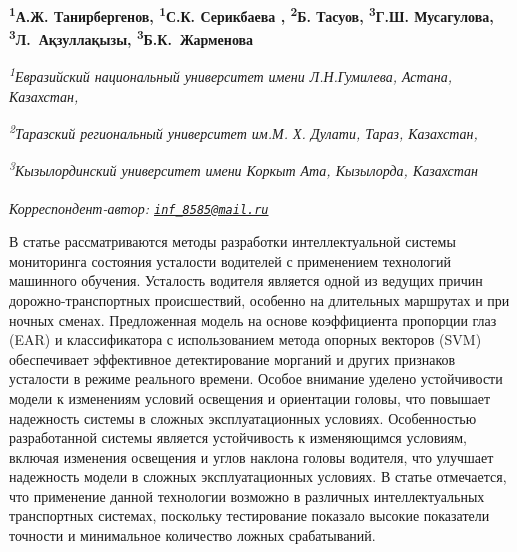 
\begin{articleheader}

{\bfseries \textsuperscript{1}А.Ж. Танирбергенов,
\textsuperscript{1}С.К. Серикбаева\textsuperscript{\envelope } ,
\textsuperscript{2}Б. Тасуов,
\textsuperscript{3}Г.Ш. Мусагулова,
\textsuperscript{3}Л.~Ақзуллақызы,
\textsuperscript{3}Б.К.~Жарменова}
\end{articleheader}

\begin{affiliation}
\emph{\textsuperscript{1}Евразийский национальный университет имени Л.Н.Гумилева, Астана, Казахстан,}

\emph{\textsuperscript{2}Таразский региональный университет им.М. Х. Дулати, Тараз, Казахстан,}

\emph{\textsuperscript{3}Кызылординский университет имени Коркыт Ата, Кызылорда, Казахстан}

\raggedright \textsuperscript{\envelope }\emph{Корреспондент-автор: \href{mailto:inf_8585@mail.ru}{\nolinkurl{inf\_8585@mail.ru}}}
\end{affiliation}

В статье рассматриваются методы разработки интеллектуальной системы
мониторинга состояния усталости водителей с применением технологий
машинного обучения. Усталость водителя является одной из ведущих причин
дорожно-транспортных происшествий, особенно на длительных маршрутах и
при ночных сменах. Предложенная модель на основе коэффициента пропорции
глаз (EAR) и классификатора с использованием метода опорных векторов
(SVM) обеспечивает эффективное детектирование морганий и других
признаков усталости в режиме реального времени. Особое внимание уделено
устойчивости модели к изменениям условий освещения и ориентации головы,
что повышает надежность системы в сложных эксплуатационных условиях.
Особенностью разработанной системы является устойчивость к изменяющимся
условиям, включая изменения освещения и углов наклона головы водителя,
что улучшает надежность модели в сложных эксплуатационных условиях. В
статье отмечается, что применение данной технологии возможно в различных
интеллектуальных транспортных системах, поскольку тестирование показало
высокие показатели точности и минимальное количество ложных
срабатываний.

